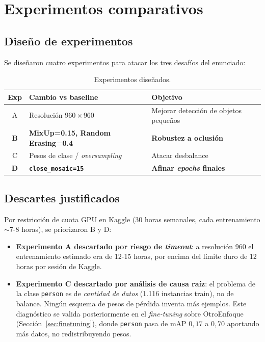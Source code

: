 \documentclass[journal,onecolumn,11pt]{IEEEtran}
\begin{document}
\section{Experimentos comparativos}

\subsection{Diseño de experimentos}

Se diseñaron cuatro experimentos para atacar los tres desafíos del
enunciado:

\begin{table}[H]
\centering
\caption{Experimentos diseñados.}
\label{tab:experimentos}
\begin{tabular}{c l p{6cm}}
\toprule
\textbf{Exp} & \textbf{Cambio vs baseline} & \textbf{Objetivo} \\
\midrule
A & Resolución $960 \times 960$ & Mejorar detección de objetos
pequeños \\
\textbf{B} & \textbf{MixUp=0.15, Random Erasing=0.4} &
\textbf{Robustez a oclusión} \\
C & Pesos de clase / \textit{oversampling} & Atacar desbalance \\
\textbf{D} & \textbf{\texttt{close\_mosaic=15}} & \textbf{Afinar
\textit{epochs} finales} \\
\bottomrule
\end{tabular}
\end{table}

\subsection{Descartes justificados}

Por restricción de cuota GPU en Kaggle (30 horas semanales, cada
entrenamiento $\sim 7$-8 horas), se priorizaron B y D:

\begin{itemize}[leftmargin=*]
    \item \textbf{Experimento A descartado por riesgo de
    \textit{timeout}}: a resolución 960 el entrenamiento estimado
    era de 12-15 horas, por encima del límite duro de 12 horas por
    sesión de Kaggle.
    \item \textbf{Experimento C descartado por análisis de causa
    raíz}: el problema de la clase \texttt{person} es de
    \emph{cantidad de datos} (1.116 instancias train), no de
    balance. Ningún esquema de pesos de pérdida inventa más
    ejemplos. Este diagnóstico se valida posteriormente en el
    \textit{fine-tuning} sobre OtroEnfoque
    (Sección~\ref{sec:finetuning}), donde \texttt{person} pasa de
    mAP $0{,}17$ a $0{,}70$ aportando más datos, no
    redistribuyendo pesos.
\end{itemize}
\end{document}
